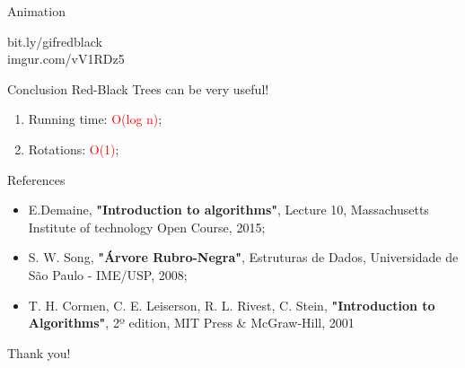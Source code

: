 \documentclass{beamer}
\begin{document}
\begin{frame}{Animation}
\begin{center}
    bit.ly/gifredblack\\
    imgur.com/vV1RDz5
\end{center}
\end{frame}

\begin{frame}{Conclusion}
Red-Black Trees can be very useful!
\begin{enumerate}
    \item Running time: \textcolor{red}{O(log n)};
    \item Rotations: \textcolor{red}{O(1)};
\end{enumerate}    
\end{frame}

\begin{frame}{References}
\begin{itemize}
\item \small{E.Demaine, \textbf{"Introduction to algorithms"}, Lecture 10, Massachusetts Institute of technology Open Course, 2015;}
\item \small{S. W. Song, \textbf{"Árvore Rubro-Negra"}, Estruturas de Dados, Universidade de São Paulo - IME/USP, 2008;}
\item \small{T. H. Cormen, C. E. Leiserson, R. L. Rivest, C. Stein, \textbf{"Introduction to Algorithms"}, 2º edition, MIT Press \& McGraw-Hill, 2001}
\end{itemize}
\end{frame}

\begin{frame}{}
\centering
\color{red}
\Huge Thank you!
\end{frame}
\end{document}
